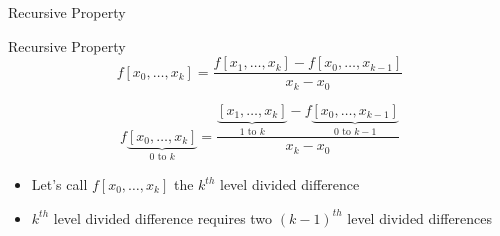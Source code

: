 \documentclass[10pt]{beamer}
\begin{document}
\begin{frame}{Recursive Property}

\begin{block}{Recursive Property}
$$ f[x_0,\dots,x_k] = \frac{f[x_1,\dots,x_k]-f[x_0,\dots,x_{k-1}]}{x_k - x_0}$$
\end{block}

$$ f\underbrace{[x_0,\dots,x_k]}_{0 \text{ to } k} = \frac{\underbrace{[x_1,\dots,x_k]}_{1 \text{ to } k}-f\underbrace{[x_0,\dots,x_{k-1}]}_{0 \text{ to }k-1}}{x_k - x_0}$$

\begin{itemize}
    \item Let's call $f[x_0,\dots,x_k]$ the $k^{th}$ level divided difference
    \item $k^{th}$ level divided difference requires two $(k-1)^{th}$ level divided differences
\end{itemize}


\end{frame}
\end{document}
